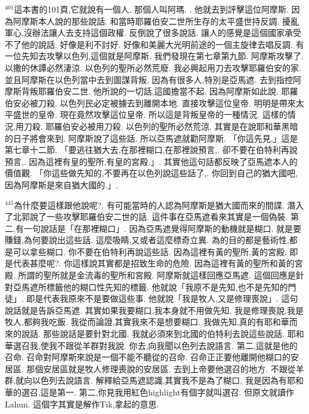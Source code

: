 \documentclass{book}
\begin{document}
$^{401}$這本書的101頁,它就說有一個人.
那個人叫阿瑪. .
他就去到評擊這位阿摩斯.
因為阿摩斯本人說的那些說話.
和當時耶羅伯安二世所生存的太平盛世持反調.
擾亂軍心,沒辦法讓人去支持這個政權.
反倒說了很多說話.
讓人的感覺是這個國家承受不了他的說話.
好像是利不討好.
好像和美麗大光明前途的一個主旋律去唱反調.
有一位先知去攻擊以色列,這個就是阿摩斯.
我們發現在第七章第九節.
阿摩斯攻擊了.
以撒的休譚必然淒涼.
以色列的聖所必然荒廢.
我必興起用刀去攻擊耶羅伯安的家.
並且阿摩斯在以色列當中去到圖謀背叛.
因為有很多人,特別是亞馬遮.
去到指控阿摩斯背叛耶羅伯安二世.
他所說的一切話,這國擔當不起.
因為阿摩斯如此說.
耶羅伯安必被刀殺.
以色列民必定被擄去到離開本地.
直接攻擊這位皇帝.
明明是帶來太平盛世的皇帝.
現在竟然攻擊這位皇帝.
所以這是背叛皇帝的一種情況.
這樣的情況,用刀殺.
耶羅伯安必被用刀殺.
以色列的聖所必然荒涼.
其實是在說耶和華黑暗的日子將會來到.
阿摩斯說了這些話.
所以亞馬遮就勸阿摩斯.
「你這先見,」這是第七章十二節.
「要逃往猶大去,在那裡糊口,在那裡說預言,.
卻不要在伯特利再說預言,.
因為這裡有皇的聖所,有皇的宮殿.」.
其實他這句話都反映了亞馬遮本人的價值觀.
「你這些做先知的,不要再在以色列說這些話了,.
你回到自己的猶大國吧,因為阿摩斯是來自猶大國的.」.

$^{441}$為什麼要這樣跟他說呢?.
有可能當時的人認為阿摩斯是猶大國而來的間諜.
潛入了北郭說了一些攻擊耶羅伯安二世的話.
這件事在亞馬遮看來其實是一個偽裝.
第二,有一句說話是「在那裡糊口」.
因為亞馬遮覺得阿摩斯的動機就是糊口.
就是要賺錢,為何要說出這些話.
這麼吸睛,又或者這麼標奇立異.
為的目的都是藝術性,都是可以拿些糊口.
你不要在伯特利再說這些話.
因為這裡有黃的聖所,黃的宮殿.
即是代表甚麼呢?.
你這樣說其實都是招致生命的危險.
因為這裡有黃的聖所和黃的宮殿.
所謂的聖所就是金流毒的聖所和宮殿.
阿摩斯就這樣回應亞馬遮.
這個回應是針對亞馬遮所標籤他的糊口性先知的標籤.
他就說「我原不是先知,也不是先知的門徒」.
即是代表我原來不是要做這些事.
他就說「我是牧人,又是修理喪說」.
這句說話就是告訴亞馬遮.
其實如果我要糊口,我本身就不用做先知.
我是修理喪說,我是牧人,都夠我吃飯.
我從而論證,其實我來不是想要糊口.
我做先知,真的有耶和華而來的說話.
那些說話是要針對北國.
我就必須來到北國的伯特利去說這些說話.
耶和華選召我,使我不跟從羊群對我說.
你去,向我聞以色列去說語言.
第二,這就是他的召命.
召命對阿摩斯來說是一個不能不聽從的召命.
召命正正要他離開他糊口的安居區.
那個安居區就是牧人修理喪說的安居區.
去到上帝要他選召的地方.
不跟從羊群,就向以色列去說語言.
解釋給亞馬遮認識,其實我不是為了糊口.
我是因為有耶和華的選召,這是第一.
第二,你見我用紅色highlight有個字就叫選召.
但原文就讀作Lahun.
這個字其實是解作Tik,拿起的意思.
\end{document}
